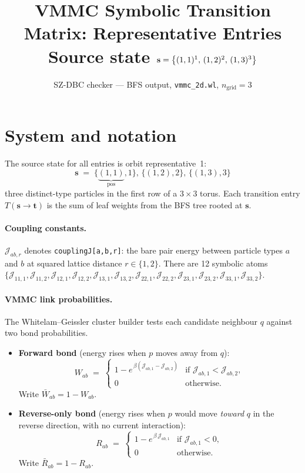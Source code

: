 \documentclass[11pt,a4paper]{article}
\title{\textbf{VMMC Symbolic Transition Matrix: Representative Entries}\\[4pt]
       \large Source state $\s = \bigl\{(1,1)^1,\,(1,2)^2,\,(1,3)^3\bigr\}$}
\author{SZ-DBC checker --- BFS output, \texttt{vmmc\_2d.wl}, $n_\text{grid}=3$}
\date{}
\newcommand{\J}[2]{\mathcal{J}_{#1,#2}}
\newcommand{\W}[1]{W_{#1}}
\newcommand{\Wb}[1]{\bar{W}_{#1}}
\newcommand{\R}[1]{R_{#1}}
\newcommand{\Rb}[1]{\bar{R}_{#1}}
\newcommand{\s}{\mathbf{s}}
\newcommand{\tp}{\mathbf{t}}
\begin{document}
\maketitle

\section*{System and notation}

The source state for all entries is orbit representative~1:
\[
  \s \;=\; \bigl\{\underbrace{(1,1)}_{\text{pos}},\!1\bigr\},\,
           \bigl\{(1,2),2\bigr\},\,
           \bigl\{(1,3),3\bigr\}
\]
three distinct-type particles in the first row of a $3\times3$ torus.
Each transition entry $T(\s\to\tp)$ is the sum of leaf weights
from the BFS tree rooted at $\s$.

\paragraph{Coupling constants.}
$\J{ab}{r}$ denotes \texttt{couplingJ[a,b,r]}: the bare pair energy between
particle types $a$ and $b$ at squared lattice distance $r\in\{1,2\}$.
There are 12 symbolic atoms
$\{\J{11}{1},\J{11}{2},\J{12}{1},\J{12}{2},\J{13}{1},\J{13}{2},
   \J{22}{1},\J{22}{2},\J{23}{1},\J{23}{2},\J{33}{1},\J{33}{2}\}$.

\paragraph{VMMC link probabilities.}
The Whitelam--Geissler cluster builder tests each candidate neighbour $q$
against two bond probabilities.
\begin{itemize}
\item \textbf{Forward bond} (energy rises when $p$ moves away from $q$):
\[
  \W{ab} \;=\;
  \begin{cases}
    1 - e^{\,\beta(\J{ab}{1}-\J{ab}{2})} & \text{if } \J{ab}{1} < \J{ab}{2},\\
    0 & \text{otherwise}.
  \end{cases}
\]
Write $\Wb{ab} = 1-\W{ab}$.

\item \textbf{Reverse-only bond} (energy rises when $p$ would move \emph{toward}
  $q$ in the reverse direction, with no current interaction):
\[
  \R{ab} \;=\;
  \begin{cases}
    1 - e^{\,\beta\,\J{ab}{1}} & \text{if } \J{ab}{1} < 0,\\
    0 & \text{otherwise}.
  \end{cases}
\]
Write $\Rb{ab} = 1-\R{ab}$.
\end{itemize}
\end{document}
